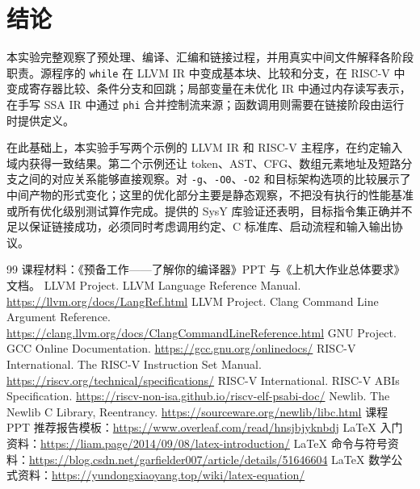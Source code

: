 \documentclass[UTF8,a4paper,12pt]{ctexart}
\begin{document}
\section{结论}

本实验完整观察了预处理、编译、汇编和链接过程，并用真实中间文件解释各阶段职责。源程序的 \texttt{while} 在 LLVM IR 中变成基本块、比较和分支，在 RISC-V 中变成寄存器比较、条件分支和回跳；局部变量在未优化 IR 中通过内存读写表示，在手写 SSA IR 中通过 \texttt{phi} 合并控制流来源；函数调用则需要在链接阶段由运行时提供定义。

在此基础上，本实验手写两个示例的 LLVM IR 和 RISC-V 主程序，在约定输入域内获得一致结果。第二个示例还让 token、AST、CFG、数组元素地址及短路分支之间的对应关系能够直接观察。对 \texttt{-g}、\texttt{-O0}、\texttt{-O2} 和目标架构选项的比较展示了中间产物的形式变化；这里的优化部分主要是静态观察，不把没有执行的性能基准或所有优化级别测试算作完成。提供的 SysY 库验证还表明，目标指令集正确并不足以保证链接成功，必须同时考虑调用约定、C 标准库、启动流程和输入输出协议。

\begin{thebibliography}{99}
 课程材料：《预备工作——了解你的编译器》PPT 与《上机大作业总体要求》文档。
 LLVM Project. LLVM Language Reference Manual. \url{https://llvm.org/docs/LangRef.html}
 LLVM Project. Clang Command Line Argument Reference. \url{https://clang.llvm.org/docs/ClangCommandLineReference.html}
 GNU Project. GCC Online Documentation. \url{https://gcc.gnu.org/onlinedocs/}
 RISC-V International. The RISC-V Instruction Set Manual. \url{https://riscv.org/technical/specifications/}
 RISC-V International. RISC-V ABIs Specification. \url{https://riscv-non-isa.github.io/riscv-elf-psabi-doc/}
 Newlib. The Newlib C Library, Reentrancy. \url{https://sourceware.org/newlib/libc.html}
 课程 PPT 推荐报告模板：\url{https://www.overleaf.com/read/hnsjbjyknbdj}
 LaTeX 入门资料：\url{https://liam.page/2014/09/08/latex-introduction/}
 LaTeX 命令与符号资料：\url{https://blog.csdn.net/garfielder007/article/details/51646604}
 LaTeX 数学公式资料：\url{https://yundongxiaoyang.top/wiki/latex-equation/}
\end{thebibliography}
\end{document}
